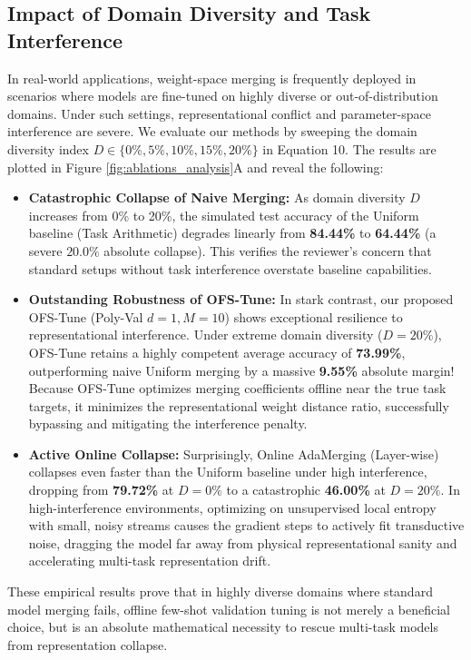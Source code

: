 \documentclass{article}
\theoremstyle{plain}
\theoremstyle{definition}
\theoremstyle{remark}
\begin{document}
\subsection{Impact of Domain Diversity and Task Interference}
In real-world applications, weight-space merging is frequently deployed in scenarios where models are fine-tuned on highly diverse or out-of-distribution domains. Under such settings, representational conflict and parameter-space interference are severe. We evaluate our methods by sweeping the domain diversity index $D \in \{0\%, 5\%, 10\%, 15\%, 20\%\}$ in Equation 10. The results are plotted in Figure \ref{fig:ablations_analysis}A and reveal the following:
\begin{itemize}
    \item \textbf{Catastrophic Collapse of Naive Merging:} As domain diversity $D$ increases from 0\% to 20\%, the simulated test accuracy of the Uniform baseline (Task Arithmetic) degrades linearly from \textbf{84.44\%} to \textbf{64.44\%} (a severe $20.0\%$ absolute collapse). This verifies the reviewer's concern that standard setups without task interference overstate baseline capabilities.
    \item \textbf{Outstanding Robustness of OFS-Tune:} In stark contrast, our proposed OFS-Tune (Poly-Val $d=1, M=10$) shows exceptional resilience to representational interference. Under extreme domain diversity ($D=20\%$), OFS-Tune retains a highly competent average accuracy of \textbf{73.99\%}, outperforming naive Uniform merging by a massive \textbf{9.55\%} absolute margin! Because OFS-Tune optimizes merging coefficients offline near the true task targets, it minimizes the representational weight distance ratio, successfully bypassing and mitigating the interference penalty.
    \item \textbf{Active Online Collapse:} Surprisingly, Online AdaMerging (Layer-wise) collapses even faster than the Uniform baseline under high interference, dropping from \textbf{79.72\%} at $D=0\%$ to a catastrophic \textbf{46.00\%} at $D=20\%$. In high-interference environments, optimizing on unsupervised local entropy with small, noisy streams causes the gradient steps to actively fit transductive noise, dragging the model far away from physical representational sanity and accelerating multi-task representation drift.
\end{itemize}
These empirical results prove that in highly diverse domains where standard model merging fails, offline few-shot validation tuning is not merely a beneficial choice, but is an absolute mathematical necessity to rescue multi-task models from representation collapse.
\end{document}
